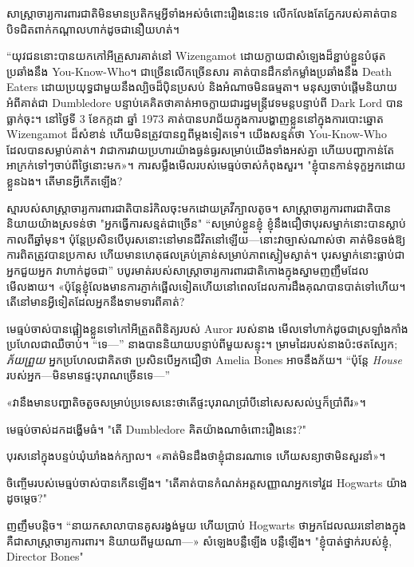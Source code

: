 {សាស្ត្រាចារ្យ​ការពារ​ជាតិ​មិន​មាន​ប្រតិកម្ម​អ្វី​ទាំង​អស់​ចំពោះ​រឿង​នេះ​ទេ លើក​លែង​តែ​ភ្នែក​របស់​គាត់​បាន​បិទ​ជិត​ពាក់​កណ្តាល​ហាក់​ដូច​ជា​នឿយ​ហត់។

“យុវជន​នោះ​បាន​យក​កៅអី​គ្រួសារ​គាត់​នៅ Wizengamot ដោយ​ក្លាយ​ជា​សំឡេង​ដ៏​ខ្ជាប់ខ្ជួន​បំផុត​ប្រឆាំង​នឹង You-Know-Who។ ជាច្រើនលើកច្រើនសារ គាត់បានដឹកនាំកម្លាំងប្រឆាំងនឹង Death Eaters ដោយប្រយុទ្ធជាមួយនឹងល្បិចដ៏ប៉ិនប្រសប់ និងអំណាចមិនធម្មតា។ មនុស្សចាប់ផ្តើមនិយាយអំពីគាត់ជា Dumbledore បន្ទាប់គេគិតថាគាត់អាចក្លាយជារដ្ឋមន្ត្រីវេទមន្តបន្ទាប់ពី Dark Lord បានធ្លាក់ចុះ។ នៅថ្ងៃទី 3 ខែកក្កដា ឆ្នាំ 1973 គាត់បានបរាជ័យក្នុងការបង្ហាញខ្លួននៅក្នុងការបោះឆ្នោត Wizengamot ដ៏សំខាន់ ហើយមិនត្រូវបានឮពីម្តងទៀតទេ។ យើងសន្មត់ថា You-Know-Who ដែលបានសម្លាប់គាត់។ វា​ជា​ការ​វាយ​ប្រហារ​យ៉ាង​ធ្ងន់ធ្ងរ​សម្រាប់​យើង​ទាំង​អស់​គ្នា ហើយ​បញ្ហា​កាន់​តែ​អាក្រក់​ទៅៗ​ចាប់​ពី​ថ្ងៃ​នោះ​មក»។ ការសម្លឹងមើលរបស់មេធ្មប់ចាស់កំពុងសួរ។ "ខ្ញុំបានកាន់ទុក្ខអ្នកដោយខ្លួនឯង។ តើមានអ្វីកើតឡើង?

ស្មា​របស់​សាស្ត្រាចារ្យ​ការពារ​ជាតិ​បាន​រំកិល​ចុះ​មក​ដោយ​គ្រវីក្បាល​តូច។ សាស្ត្រាចារ្យការពារជាតិបាននិយាយយ៉ាងស្រទន់ថា "អ្នកធ្វើការសន្មត់ជាច្រើន" “សម្រាប់ខ្លួនខ្ញុំ ខ្ញុំនឹងជឿថាបុរសម្នាក់នោះបានស្លាប់កាលពីឆ្នាំមុន។ ប៉ុន្តែ​ប្រសិនបើ​បុរស​នោះ​នៅមាន​ជីវិត​នៅឡើយ—នោះ​វា​ច្បាស់​ណាស់​ថា គាត់​មិន​ចង់​ឱ្យ​ការពិត​ត្រូវបាន​ប្រកាស ហើយ​មាន​ហេតុផល​គ្រប់គ្រាន់​សម្រាប់​ភាពស្ងៀមស្ងាត់​។ បុរសម្នាក់នោះធ្លាប់ជាអ្នកជួយអ្នក វាហាក់ដូចជា” បបូរមាត់​របស់​សាស្ត្រាចារ្យ​ការពារ​ជាតិ​កោង​ក្នុង​ស្នាមញញឹម​ដែល​មើលងាយ។ «​ប៉ុន្តែ​ខ្ញុំ​លែង​មាន​ការ​ភ្ញាក់​ផ្អើល​ទៀត​ហើយ​នៅ​ពេល​ដែល​ការ​ដឹងគុណ​បាន​បាត់​ទៅ​ហើយ។ តើ​នៅ​មាន​អ្វី​ទៀត​ដែល​អ្នក​នឹង​ទាមទារ​ពី​គាត់?

មេធ្មប់ចាស់បានផ្អៀងខ្លួនទៅកៅអីត្រួតពិនិត្យរបស់ Auror របស់នាង មើលទៅហាក់ដូចជាស្រឡាំងកាំង ប្រហែលជាឈឺចាប់។ “ទេ—” នាងបាននិយាយបន្ទាប់ពីមួយសន្ទុះ។ ម្រាមដៃរបស់នាងប៉ះថតស្បែក; \emph{ភ័យព្រួយ} អ្នកប្រហែលជាគិតថា ប្រសិនបើអ្នកជឿថា Amelia Bones អាចនឹងភ័យ។ “ប៉ុន្តែ \emph{House} របស់អ្នក—មិនមានផ្ទះបុរាណច្រើនទេ—”

«វា​នឹង​មាន​បញ្ហា​តិចតួច​សម្រាប់​ប្រទេស​នេះ​ថា​តើ​ផ្ទះ​បុរាណ​ប្រាំបី​នៅ​សេសសល់​ឬ​ក៏​ប្រាំពីរ»។

មេធ្មប់ចាស់ដកដង្ហើមធំ។ "តើ Dumbledore គិតយ៉ាងណាចំពោះរឿងនេះ?"

បុរស​នៅ​ក្នុង​បន្ទប់​ឃុំឃាំង​ងក់​ក្បាល។ «គាត់​មិន​ដឹង​ថា​ខ្ញុំ​ជា​នរណា​ទេ ហើយ​សន្យា​ថា​មិន​សួរ​នាំ»។

ចិញ្ចើមរបស់មេធ្មប់ចាស់បានកើនឡើង។ "តើគាត់បានកំណត់អត្តសញ្ញាណអ្នកទៅវួដ Hogwarts យ៉ាងដូចម្តេច?"

ញញឹមបន្តិច។ “នាយកសាលាបានគូសរង្វង់មួយ ហើយប្រាប់ Hogwarts ថាអ្នកដែលឈរនៅខាងក្នុងគឺជាសាស្រ្តាចារ្យការពារ។ និយាយ​ពី​មួយ​ណា—» សំឡេង​បន្លឺ​ឡើង បន្លឺឡើង។ "ខ្ញុំបាត់ថ្នាក់របស់ខ្ញុំ, Director Bones"

}
